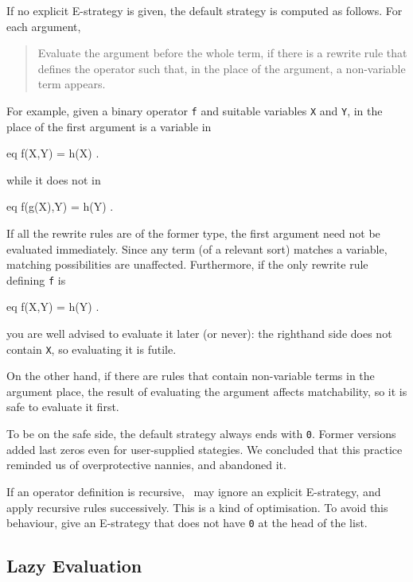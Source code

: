 \documentclass[a4paper]{memoir}
\begin{document}
If no explicit E-strategy is given, the default strategy is computed
as follows. For each argument,
\begin{quote}
  Evaluate the argument before the whole term,
  if there is a rewrite rule that defines the operator such that,
  in the place of the argument, a non-variable term appears.
\end{quote}
For example, given a binary operator \verb|f| and suitable variables
\verb|X| and \verb|Y|, in the place of the first argument is
a variable in
\begin{vvtm}
\begin{ccode}
  eq f(X,Y) = h(X) .
\end{ccode}
\end{vvtm}
while it does not in
\begin{vvtm}
\begin{ccode}
  eq f(g(X),Y) = h(Y) .
\end{ccode}
\end{vvtm}
If all the rewrite rules are of the former type, the first argument
need not be evaluated immediately. Since any term (of a relevant sort)
matches a variable, matching possibilities are unaffected. Furthermore,
if the only rewrite rule defining \verb|f| is
\begin{vvtm}
\begin{ccode}
  eq f(X,Y) = h(Y) .
\end{ccode}
\end{vvtm}
you are well advised to evaluate it later (or never):
the righthand side does not contain \verb|X|, so evaluating it is futile.

On the other hand, if there are rules that contain non-variable terms in
the argument place, the result of evaluating the argument affects
matchability, so it is safe to evaluate it first.

\begin{warning}
  To be on the safe side, the default strategy always ends with
  \verb|0|. Former versions added last zeros even for
  user-supplied stategies. We concluded that this practice
  reminded us of overprotective nannies, and abandoned it.
\end{warning}

If an operator definition is recursive, \cafeobj~may ignore an explicit
E-strategy, and apply recursive rules successively. This is a kind of
optimisation. To avoid this behaviour, give an E-strategy that does not
have \verb|0| at the head of the list.

\subsection{Lazy Evaluation}
\end{document}
